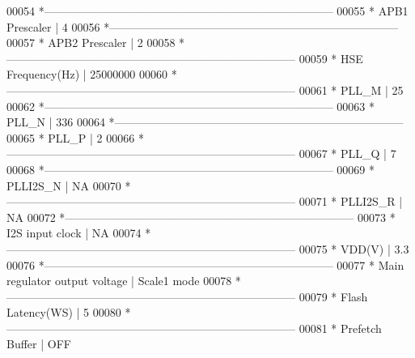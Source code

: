 \begin{DoxyCode}
00054 \textcolor{comment}{  *-----------------------------------------------------------------------------}
00055 \textcolor{comment}{  *        APB1 Prescaler                         | 4}
00056 \textcolor{comment}{  *-----------------------------------------------------------------------------}
00057 \textcolor{comment}{  *        APB2 Prescaler                         | 2}
00058 \textcolor{comment}{  *-----------------------------------------------------------------------------}
00059 \textcolor{comment}{  *        HSE Frequency(Hz)                      | 25000000}
00060 \textcolor{comment}{  *-----------------------------------------------------------------------------}
00061 \textcolor{comment}{  *        PLL\_M                                  | 25}
00062 \textcolor{comment}{  *-----------------------------------------------------------------------------}
00063 \textcolor{comment}{  *        PLL\_N                                  | 336}
00064 \textcolor{comment}{  *-----------------------------------------------------------------------------}
00065 \textcolor{comment}{  *        PLL\_P                                  | 2}
00066 \textcolor{comment}{  *-----------------------------------------------------------------------------}
00067 \textcolor{comment}{  *        PLL\_Q                                  | 7}
00068 \textcolor{comment}{  *-----------------------------------------------------------------------------}
00069 \textcolor{comment}{  *        PLLI2S\_N                               | NA}
00070 \textcolor{comment}{  *-----------------------------------------------------------------------------}
00071 \textcolor{comment}{  *        PLLI2S\_R                               | NA}
00072 \textcolor{comment}{  *-----------------------------------------------------------------------------}
00073 \textcolor{comment}{  *        I2S input clock                        | NA}
00074 \textcolor{comment}{  *-----------------------------------------------------------------------------}
00075 \textcolor{comment}{  *        VDD(V)                                 | 3.3}
00076 \textcolor{comment}{  *-----------------------------------------------------------------------------}
00077 \textcolor{comment}{  *        Main regulator output voltage          | Scale1 mode}
00078 \textcolor{comment}{  *-----------------------------------------------------------------------------}
00079 \textcolor{comment}{  *        Flash Latency(WS)                      | 5}
00080 \textcolor{comment}{  *-----------------------------------------------------------------------------}
00081 \textcolor{comment}{  *        Prefetch Buffer                        | OFF}

\end{DoxyCode}
